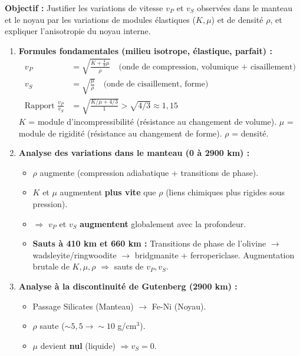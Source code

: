 \documentclass[11pt]{article}
\begin{document}
\begin{methode}
\textbf{Objectif :} Justifier les variations de vitesse $v_P$ et $v_S$ observées dans le manteau et le noyau par les variations de modules élastiques ($K, \mu$) et de densité $\rho$, et expliquer l'anisotropie du noyau interne.
\begin{enumerate}
    \item \textbf{Formules fondamentales (milieu isotrope, élastique, parfait) :}
    \begin{align*}
        v_P &= \sqrt{\frac{K + \frac{4}{3}\mu}{\rho}} \quad \text{(onde de compression, volumique + cisaillement)} \\
        v_S &= \sqrt{\frac{\mu}{\rho}} \quad \text{(onde de cisaillement, forme)} \\
        \text{Rapport } \frac{v_P}{v_S} &= \sqrt{\frac{K/\mu + 4/3}{1}} > \sqrt{4/3} \approx 1,15
    \end{align*}
    $K$ = module d'incompressibilité (résistance au changement de volume). $\mu$ = module de rigidité (résistance au changement de forme). $\rho$ = densité.
    \item \textbf{Analyse des variations dans le manteau (0 à 2900 km) :}
    \begin{itemize}
        \item $\rho$ augmente (compression adiabatique + transitions de phase).
        \item $K$ et $\mu$ augmentent \textbf{plus vite} que $\rho$ (liens chimiques plus rigides sous pression).
        \item $\Rightarrow$ $v_P$ et $v_S$ \textbf{augmentent} globalement avec la profondeur.
        \item \textbf{Sauts à 410 km et 660 km :} Transitions de phase de l'olivine $\rightarrow$ wadsleyite/ringwoodite $\rightarrow$ bridgmanite + ferropericlase. Augmentation brutale de $K, \mu, \rho$ $\Rightarrow$ sauts de $v_P, v_S$.
    \end{itemize}
    \item \textbf{Analyse à la discontinuité de Gutenberg (2900 km) :}
    \begin{itemize}
        \item Passage Silicates (Manteau) $\rightarrow$ Fe-Ni (Noyau).
        \item $\rho$ saute ($\sim 5,5 \rightarrow \sim 10$ g/cm$^3$).
        \item $\mu$ devient \textbf{nul} (liquide) $\Rightarrow v_S = 0$.

\end{itemize}
\end{enumerate}
\end{methode}
\end{document}
